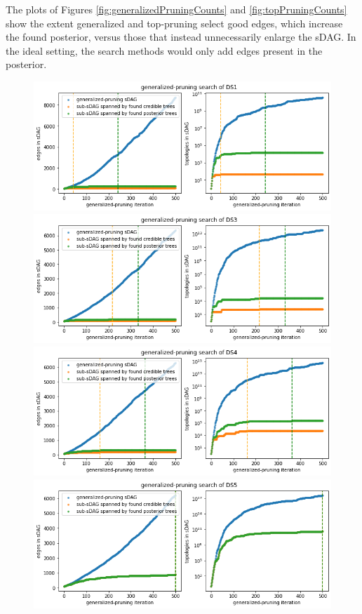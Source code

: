 \documentclass{article}
\begin{document}
The plots of Figures \ref{fig:generalizedPruningCounts} and \ref{fig:topPruningCounts} show the extent generalized and top-pruning select good edges, which increase
the found posterior, versus those that instead unnecessarily enlarge the sDAG. 
In the ideal setting, the search methods would only add edges present in the posterior.

\vspace{-2.3ex}
\begin{figure}[!hb]\centering
\includegraphics[scale=0.4]{figures/gp_ds1_counts.png}
\vspace{-1.2ex}
\includegraphics[scale=0.4]{figures/gp_ds3_counts.png}
\vspace{-1.2ex}
\includegraphics[scale=0.4]{figures/gp_ds4_counts.png}
\vspace{-1.2ex}
\includegraphics[scale=0.4]{figures/gp_ds5_counts.png}

\end{figure}
\end{document}
